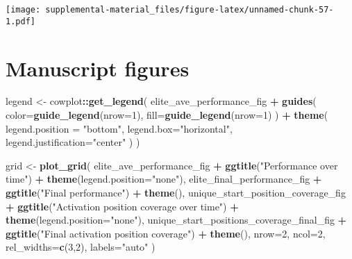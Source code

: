 \documentclass[]{book}
\newenvironment{Shaded}{\begin{snugshade}}{\end{snugshade}}
\newcommand{\DataTypeTok}[1]{\textcolor[rgb]{0.13,0.29,0.53}{#1}}
\newcommand{\DecValTok}[1]{\textcolor[rgb]{0.00,0.00,0.81}{#1}}
\newcommand{\KeywordTok}[1]{\textcolor[rgb]{0.13,0.29,0.53}{\textbf{#1}}}
\newcommand{\NormalTok}[1]{#1}
\newcommand{\OperatorTok}[1]{\textcolor[rgb]{0.81,0.36,0.00}{\textbf{#1}}}
\newcommand{\StringTok}[1]{\textcolor[rgb]{0.31,0.60,0.02}{#1}}
\begin{document}
\texttt{[image: supplemental-material\_files/figure-latex/unnamed-chunk-57-1.pdf]}

\hypertarget{manuscript-figures-4}{%
\section{Manuscript figures}\label{manuscript-figures-4}}

\begin{Shaded}
\begin{Highlighting}[]
\NormalTok{legend <-}\StringTok{ }\NormalTok{cowplot}\OperatorTok{::}\KeywordTok{get_legend}\NormalTok{(}
\NormalTok{    elite_ave_performance_fig }\OperatorTok{+}
\StringTok{      }\KeywordTok{guides}\NormalTok{(}
        \DataTypeTok{color=}\KeywordTok{guide_legend}\NormalTok{(}\DataTypeTok{nrow=}\DecValTok{1}\NormalTok{),}
        \DataTypeTok{fill=}\KeywordTok{guide_legend}\NormalTok{(}\DataTypeTok{nrow=}\DecValTok{1}\NormalTok{)}
\NormalTok{      ) }\OperatorTok{+}
\StringTok{      }\KeywordTok{theme}\NormalTok{(}
        \DataTypeTok{legend.position =} \StringTok{"bottom"}\NormalTok{,}
        \DataTypeTok{legend.box=}\StringTok{"horizontal"}\NormalTok{,}
        \DataTypeTok{legend.justification=}\StringTok{"center"}
\NormalTok{      )}
\NormalTok{  )}

\NormalTok{grid <-}\StringTok{ }\KeywordTok{plot_grid}\NormalTok{(}
\NormalTok{  elite_ave_performance_fig }\OperatorTok{+}
\StringTok{    }\KeywordTok{ggtitle}\NormalTok{(}\StringTok{"Performance over time"}\NormalTok{) }\OperatorTok{+}
\StringTok{    }\KeywordTok{theme}\NormalTok{(}\DataTypeTok{legend.position=}\StringTok{"none"}\NormalTok{),}
\NormalTok{  elite_final_performance_fig }\OperatorTok{+}
\StringTok{    }\KeywordTok{ggtitle}\NormalTok{(}\StringTok{"Final performance"}\NormalTok{) }\OperatorTok{+}
\StringTok{    }\KeywordTok{theme}\NormalTok{(),}
\NormalTok{  unique_start_position_coverage_fig }\OperatorTok{+}
\StringTok{    }\KeywordTok{ggtitle}\NormalTok{(}\StringTok{"Activation position coverage over time"}\NormalTok{) }\OperatorTok{+}
\StringTok{    }\KeywordTok{theme}\NormalTok{(}\DataTypeTok{legend.position=}\StringTok{"none"}\NormalTok{),}
\NormalTok{  unique_start_positions_coverage_final_fig }\OperatorTok{+}
\StringTok{    }\KeywordTok{ggtitle}\NormalTok{(}\StringTok{"Final activation position coverage"}\NormalTok{) }\OperatorTok{+}
\StringTok{    }\KeywordTok{theme}\NormalTok{(),}
  \DataTypeTok{nrow=}\DecValTok{2}\NormalTok{,}
  \DataTypeTok{ncol=}\DecValTok{2}\NormalTok{,}
  \DataTypeTok{rel_widths=}\KeywordTok{c}\NormalTok{(}\DecValTok{3}\NormalTok{,}\DecValTok{2}\NormalTok{),}
  \DataTypeTok{labels=}\StringTok{"auto"}
\NormalTok{)}


\end{Highlighting}
\end{Shaded}
\end{document}
